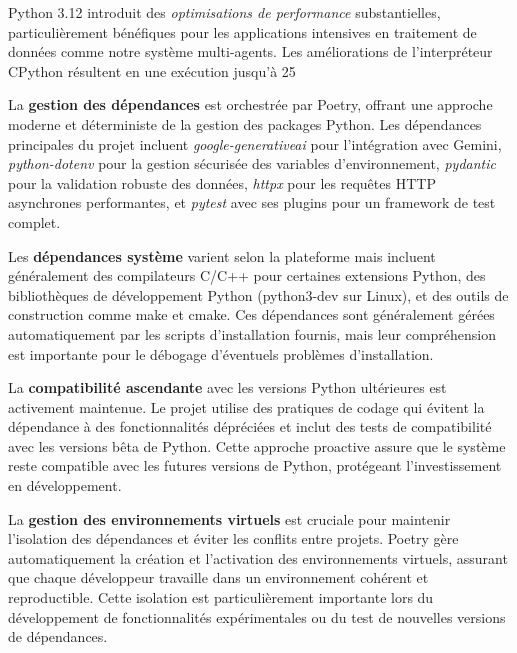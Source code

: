 Python 3.12 introduit des \emph{optimisations de performance} substantielles, particulièrement bénéfiques pour les applications intensives en traitement de données comme notre système multi-agents. Les améliorations de l'interpréteur CPython résultent en une exécution jusqu'à 25%

La \textbf{gestion des dépendances} est orchestrée par Poetry, offrant une approche moderne et déterministe de la gestion des packages Python. Les dépendances principales du projet incluent \emph{google-generativeai} pour l'intégration avec Gemini, \emph{python-dotenv} pour la gestion sécurisée des variables d'environnement, \emph{pydantic} pour la validation robuste des données, \emph{httpx} pour les requêtes HTTP asynchrones performantes, et \emph{pytest} avec ses plugins pour un framework de test complet.

Les \textbf{dépendances système} varient selon la plateforme mais incluent généralement des compilateurs C/C++ pour certaines extensions Python, des bibliothèques de développement Python (python3-dev sur Linux), et des outils de construction comme make et cmake. Ces dépendances sont généralement gérées automatiquement par les scripts d'installation fournis, mais leur compréhension est importante pour le débogage d'éventuels problèmes d'installation.

La \textbf{compatibilité ascendante} avec les versions Python ultérieures est activement maintenue. Le projet utilise des pratiques de codage qui évitent la dépendance à des fonctionnalités dépréciées et inclut des tests de compatibilité avec les versions bêta de Python. Cette approche proactive assure que le système reste compatible avec les futures versions de Python, protégeant l'investissement en développement.

La \textbf{gestion des environnements virtuels} est cruciale pour maintenir l'isolation des dépendances et éviter les conflits entre projets. Poetry gère automatiquement la création et l'activation des environnements virtuels, assurant que chaque développeur travaille dans un environnement cohérent et reproductible. Cette isolation est particulièrement importante lors du développement de fonctionnalités expérimentales ou du test de nouvelles versions de dépendances.

